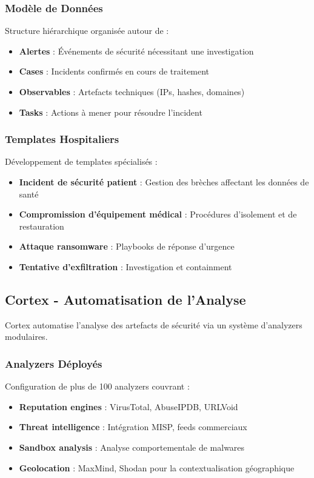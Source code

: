 \subsubsection{Modèle de Données}
Structure hiérarchique organisée autour de :
\begin{itemize}
    \item \textbf{Alertes} : Événements de sécurité nécessitant une investigation
    \item \textbf{Cases} : Incidents confirmés en cours de traitement
    \item \textbf{Observables} : Artefacts techniques (IPs, hashes, domaines)
    \item \textbf{Tasks} : Actions à mener pour résoudre l'incident
\end{itemize}

\subsubsection{Templates Hospitaliers}
Développement de templates spécialisés :
\begin{itemize}
    \item \textbf{Incident de sécurité patient} : Gestion des brèches affectant les données de santé
    \item \textbf{Compromission d'équipement médical} : Procédures d'isolement et de restauration
    \item \textbf{Attaque ransomware} : Playbooks de réponse d'urgence
    \item \textbf{Tentative d'exfiltration} : Investigation et containment
\end{itemize}

\subsection{Cortex - Automatisation de l'Analyse}

Cortex automatise l'analyse des artefacts de sécurité via un système d'analyzers modulaires.

\subsubsection{Analyzers Déployés}
Configuration de plus de 100 analyzers couvrant :
\begin{itemize}
    \item \textbf{Reputation engines} : VirusTotal, AbuseIPDB, URLVoid
    \item \textbf{Threat intelligence} : Intégration MISP, feeds commerciaux
    \item \textbf{Sandbox analysis} : Analyse comportementale de malwares
    \item \textbf{Geolocation} : MaxMind, Shodan pour la contextualisation géographique
\end{itemize}

